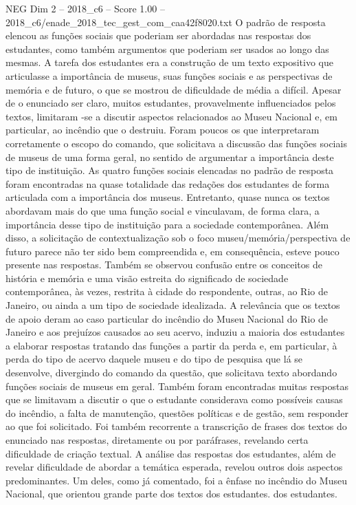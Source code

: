 \begin{textsample}{NEG Dim 2 – 2018\_c6 – Score 1.00 – 2018\_c6/enade\_2018\_tec\_gest\_com\_caa42f8020.txt}
O padrão de resposta elencou as funções sociais que poderiam ser abordadas nas respostas dos estudantes, como também argumentos que poderiam ser usados ao longo das mesmas.
A tarefa dos estudantes era a construção de um texto expositivo que articulasse a importância de museus, suas funções sociais e as perspectivas de memória e de futuro, o que se mostrou de dificuldade de média a difícil.
Apesar de o enunciado ser claro, muitos estudantes, provavelmente influenciados pelos textos, limitaram -se a discutir aspectos relacionados ao Museu Nacional e, em particular, ao incêndio que o destruiu.
Foram poucos os que interpretaram corretamente o escopo do comando, que solicitava a discussão das funções sociais de museus de uma forma geral, no sentido de argumentar a importância deste tipo de instituição.
As quatro funções sociais elencadas no padrão de resposta foram encontradas na quase totalidade das redações dos estudantes de forma articulada com a importância dos museus.
Entretanto, quase nunca os textos abordavam mais do que uma função social e vinculavam, de forma clara, a importância desse tipo de instituição para a sociedade contemporânea.
Além disso, a solicitação de contextualização sob o foco museu/memória/perspectiva de futuro parece não ter sido bem compreendida e, em consequência, esteve pouco presente nas respostas.
Também se observou confusão entre os conceitos de história e memória e uma visão estreita do significado de sociedade contemporânea, às vezes, restrita à cidade do respondente, outras, ao Rio de Janeiro, ou ainda a um tipo de sociedade idealizada.
A relevância que os textos de apoio deram ao caso particular do incêndio do Museu Nacional do Rio de Janeiro e aos prejuízos causados ao seu acervo, induziu a maioria dos estudantes a elaborar respostas tratando das funções a partir da perda e, em particular, à perda do tipo de acervo daquele museu e do tipo de pesquisa que lá se desenvolve, divergindo do comando da questão, que solicitava texto abordando funções sociais de museus em geral.
Também foram encontradas muitas respostas que se limitavam a discutir o que o estudante considerava como possíveis causas do incêndio, a falta de manutenção, questões políticas e de gestão, sem responder ao que foi solicitado.
Foi também recorrente a transcrição de frases dos textos do enunciado nas respostas, diretamente ou por paráfrases, revelando certa dificuldade de criação textual.
A análise das respostas dos estudantes, além de revelar dificuldade de abordar a temática esperada, revelou outros dois aspectos predominantes.
Um deles, como já comentado, foi a ênfase no incêndio do Museu Nacional, que orientou grande parte dos textos dos estudantes. dos estudantes.

\end{textsample}
